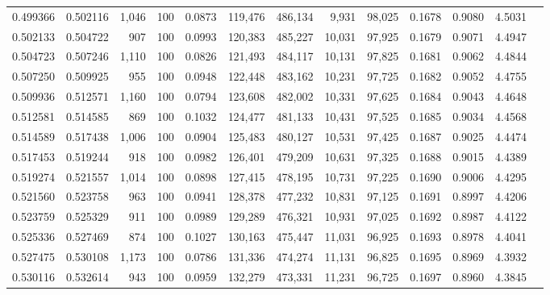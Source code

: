 \begin{tabular}{rrrrrrrrrrrrr}
0.499366 & 0.502116 & 1,046 & 100 &                                     0.0873 & 119,476 & 486,134 &   9,931 &  98,025 & 0.1678 & 0.9080 & 4.5031 \\
0.502133 & 0.504722 &   907 & 100 &                                     0.0993 & 120,383 & 485,227 &  10,031 &  97,925 & 0.1679 & 0.9071 & 4.4947 \\
0.504723 & 0.507246 & 1,110 & 100 &                                     0.0826 & 121,493 & 484,117 &  10,131 &  97,825 & 0.1681 & 0.9062 & 4.4844 \\
0.507250 & 0.509925 &   955 & 100 &                                     0.0948 & 122,448 & 483,162 &  10,231 &  97,725 & 0.1682 & 0.9052 & 4.4755 \\
0.509936 & 0.512571 & 1,160 & 100 &                                     0.0794 & 123,608 & 482,002 &  10,331 &  97,625 & 0.1684 & 0.9043 & 4.4648 \\
0.512581 & 0.514585 &   869 & 100 &                                     0.1032 & 124,477 & 481,133 &  10,431 &  97,525 & 0.1685 & 0.9034 & 4.4568 \\
0.514589 & 0.517438 & 1,006 & 100 &                                     0.0904 & 125,483 & 480,127 &  10,531 &  97,425 & 0.1687 & 0.9025 & 4.4474 \\
0.517453 & 0.519244 &   918 & 100 &                                     0.0982 & 126,401 & 479,209 &  10,631 &  97,325 & 0.1688 & 0.9015 & 4.4389 \\
0.519274 & 0.521557 & 1,014 & 100 &                                     0.0898 & 127,415 & 478,195 &  10,731 &  97,225 & 0.1690 & 0.9006 & 4.4295 \\
0.521560 & 0.523758 &   963 & 100 &                                     0.0941 & 128,378 & 477,232 &  10,831 &  97,125 & 0.1691 & 0.8997 & 4.4206 \\
0.523759 & 0.525329 &   911 & 100 &                                     0.0989 & 129,289 & 476,321 &  10,931 &  97,025 & 0.1692 & 0.8987 & 4.4122 \\
0.525336 & 0.527469 &   874 & 100 &                                     0.1027 & 130,163 & 475,447 &  11,031 &  96,925 & 0.1693 & 0.8978 & 4.4041 \\
0.527475 & 0.530108 & 1,173 & 100 &                                     0.0786 & 131,336 & 474,274 &  11,131 &  96,825 & 0.1695 & 0.8969 & 4.3932 \\
0.530116 & 0.532614 &   943 & 100 &                                     0.0959 & 132,279 & 473,331 &  11,231 &  96,725 & 0.1697 & 0.8960 & 4.3845 \\

\end{tabular}
